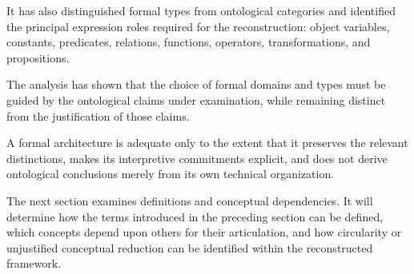 It has
also distinguished
formal types
from ontological
categories and
identified the
principal expression
roles required
for the
reconstruction:
object variables,
constants,
predicates,
relations,
functions,
operators,
transformations,
and propositions.

The analysis
has shown
that the
choice of
formal domains
and types
must be
guided by
the ontological
claims under
examination, while
remaining distinct
from the
justification of
those claims.

A formal
architecture is
adequate only
to the extent
that it
preserves the
relevant distinctions,
makes its
interpretive commitments
explicit, and
does not
derive ontological
conclusions merely
from its
own technical
organization.

The next
section examines
definitions and
conceptual dependencies.
It will determine
how the terms
introduced in
the preceding
section can
be defined,
which concepts
depend upon
others for
their articulation,
and how
circularity or
unjustified
conceptual reduction
can be
identified within
the reconstructed
framework.

